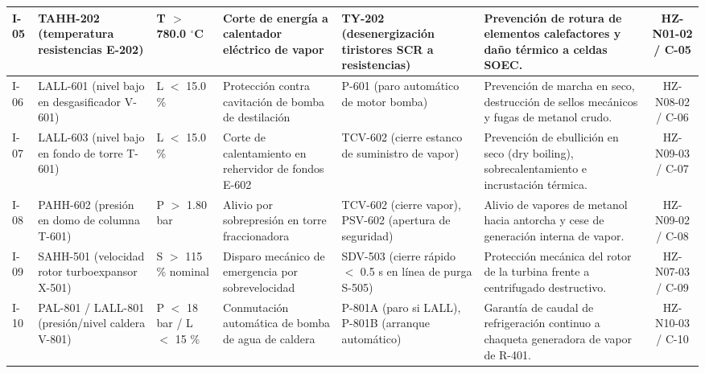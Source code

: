 \documentclass[10pt,letterpaper]{article}
\begin{document}
\begin{table}[H]
\begin{tabularx}{\textwidth}{|l|p{2.8cm}|p{2.0cm}|p{3.0cm}|p{3.2cm}|X|c|}
I-05 & TAHH-202 (temperatura resistencias E-202) & T $>$ 780.0 $^\circ$C & Corte de energía a calentador eléctrico de vapor & TY-202 (desenergización tiristores SCR a resistencias) & Prevención de rotura de elementos calefactores y daño térmico a celdas SOEC. & HZ-N01-02 / C-05 \\ \hline
I-06 & LALL-601 (nivel bajo en desgasificador V-601) & L $<$ 15.0 \% & Protección contra cavitación de bomba de destilación & P-601 (paro automático de motor bomba) & Prevención de marcha en seco, destrucción de sellos mecánicos y fugas de metanol crudo. & HZ-N08-02 / C-06 \\ \hline
I-07 & LALL-603 (nivel bajo en fondo de torre T-601) & L $<$ 15.0 \% & Corte de calentamiento en rehervidor de fondos E-602 & TCV-602 (cierre estanco de suministro de vapor) & Prevención de ebullición en seco (dry boiling), sobrecalentamiento e incrustación térmica. & HZ-N09-03 / C-07 \\ \hline
I-08 & PAHH-602 (presión en domo de columna T-601) & P $>$ 1.80 bar & Alivio por sobrepresión en torre fraccionadora & TCV-602 (cierre vapor), PSV-602 (apertura de seguridad) & Alivio de vapores de metanol hacia antorcha y cese de generación interna de vapor. & HZ-N09-02 / C-08 \\ \hline
I-09 & SAHH-501 (velocidad rotor turboexpansor X-501) & S $>$ 115 \% nominal & Disparo mecánico de emergencia por sobrevelocidad & SDV-503 (cierre rápido $<$ 0.5 s en línea de purga S-505) & Protección mecánica del rotor de la turbina frente a centrifugado destructivo. & HZ-N07-03 / C-09 \\ \hline
I-10 & PAL-801 / LALL-801 (presión/nivel caldera V-801) & P $<$ 18 bar / L $<$ 15 \% & Conmutación automática de bomba de agua de caldera & P-801A (paro si LALL), P-801B (arranque automático) & Garantía de caudal de refrigeración continuo a chaqueta generadora de vapor de R-401. & HZ-N10-03 / C-10 \\ \hline
\end{tabularx}
\end{table}
\end{document}
